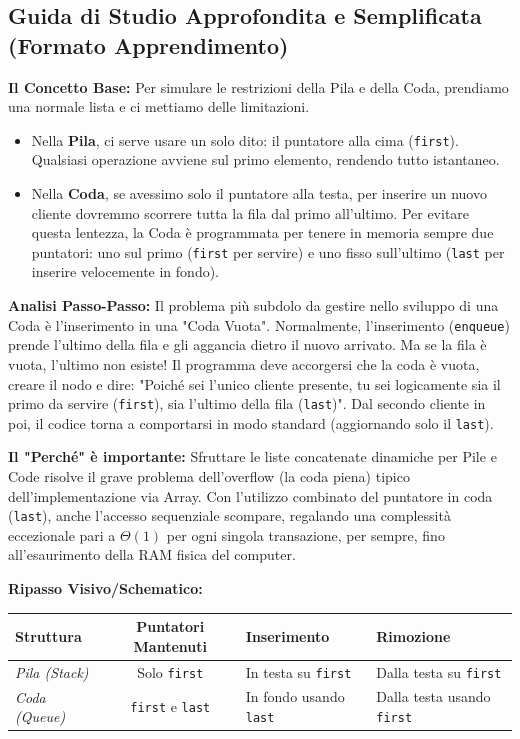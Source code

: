 \documentclass[a4paper, 11pt]{report}
\begin{document}
\vspace{0.5cm}
\subsection*{Guida di Studio Approfondita e Semplificata (Formato Apprendimento)}

\textbf{Il Concetto Base:}
Per simulare le restrizioni della Pila e della Coda, prendiamo una normale lista e ci mettiamo delle limitazioni.
\begin{itemize}
\item Nella \textbf{Pila}, ci serve usare un solo dito: il puntatore alla cima (\texttt{first}). Qualsiasi operazione avviene sul primo elemento, rendendo tutto istantaneo.
\item Nella \textbf{Coda}, se avessimo solo il puntatore alla testa, per inserire un nuovo cliente dovremmo scorrere tutta la fila dal primo all'ultimo. Per evitare questa lentezza, la Coda è programmata per tenere in memoria sempre due puntatori: uno sul primo (\texttt{first} per servire) e uno fisso sull'ultimo (\texttt{last} per inserire velocemente in fondo).
\end{itemize}

\textbf{Analisi Passo-Passo:}
Il problema più subdolo da gestire nello sviluppo di una Coda è l'inserimento in una "Coda Vuota".
Normalmente, l'inserimento (\texttt{enqueue}) prende l'ultimo della fila e gli aggancia dietro il nuovo arrivato. Ma se la fila è vuota, l'ultimo non esiste!
Il programma deve accorgersi che la coda è vuota, creare il nodo e dire: "Poiché sei l'unico cliente presente, tu sei logicamente sia il primo da servire (\texttt{first}), sia l'ultimo della fila (\texttt{last})". Dal secondo cliente in poi, il codice torna a comportarsi in modo standard (aggiornando solo il \texttt{last}).

\textbf{Il "Perché" è importante:}
Sfruttare le liste concatenate dinamiche per Pile e Code risolve il grave problema dell'overflow (la coda piena) tipico dell'implementazione via Array. Con l'utilizzo combinato del puntatore in coda (\texttt{last}), anche l'accesso sequenziale scompare, regalando una complessità eccezionale pari a $\Theta(1)$ per ogni singola transazione, per sempre, fino all'esaurimento della RAM fisica del computer.

\textbf{Ripasso Visivo/Schematico:}
\begin{center}
\begin{tabular}{|l|c|p{4cm}|p{4.5cm}|}
\hline
\textbf{Struttura} & \textbf{Puntatori Mantenuti} & \textbf{Inserimento} & \textbf{Rimozione} \\
\hline
\textit{Pila (Stack)} & Solo \texttt{first} & In testa su \texttt{first} & Dalla testa su \texttt{first} \\
\hline
\textit{Coda (Queue)} & \texttt{first} e \texttt{last} & In fondo usando \texttt{last} & Dalla testa usando \texttt{first} \\
\hline
\end{tabular}
\end{center}
\end{document}
